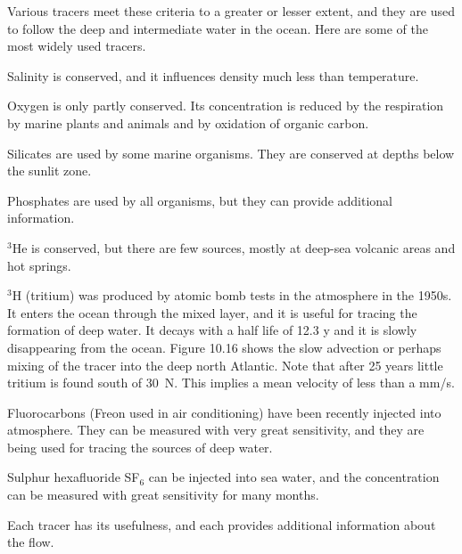 Various tracers meet these criteria to a greater or lesser extent, and
they are used to follow the deep and intermediate water in the
ocean. Here are some of the most widely used tracers.
\begin{enumerate}
\vitem Salinity is conserved, and it influences density much less than
temperature.

\vitem Oxygen is only partly conserved. Its concentration is reduced
by the respiration by marine plants and animals and by oxidation of
organic carbon.

\vitem Silicates are used by some marine organisms. They are conserved
at depths below the sunlit zone.

\vitem Phosphates are used by all organisms, but they can provide
additional information.

\vitem $^3$He is conserved, but there are few sources, mostly at
deep-sea volcanic areas and hot springs.

\vitem $^3$H (tritium) was produced by atomic bomb tests in the
atmosphere in the 1950s. It enters the ocean through the mixed
layer, and it is useful for tracing the formation
of deep water. It decays with a half life of 12.3 y and it is slowly
disappearing from the ocean. Figure 10.16 shows the slow advection or
perhaps mixing of the tracer into the deep
north Atlantic. Note that after 25 years little tritium is found south
of 30\degrees\ N. This implies a mean velocity of less than a mm/s.

\vitem Fluorocarbons (Freon used in air conditioning) have been
recently injected into atmosphere. They can be measured with very
great sensitivity, and they are being used for tracing the sources of
deep water.

\vitem Sulphur hexafluoride SF$_6$ can be injected into sea water, and
the concentration can be measured with great sensitivity for many
months.
\end{enumerate}
Each tracer has its usefulness, and each provides additional
information about the flow.

